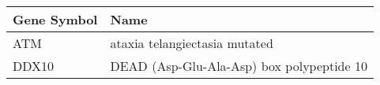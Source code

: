 \begin{tabular}{ll}
\toprule
Gene Symbol &                                      Name \\
\midrule
        ATM &             ataxia telangiectasia mutated \\
      DDX10 & DEAD (Asp-Glu-Ala-Asp) box polypeptide 10 \\
\bottomrule
\end{tabular}

